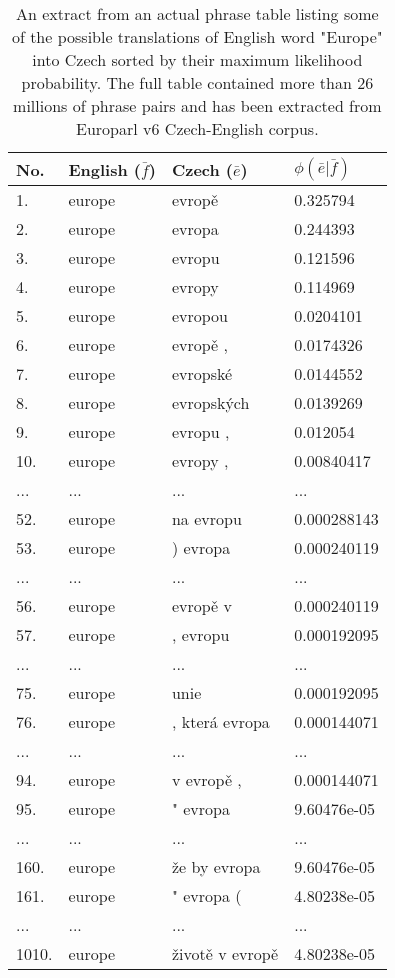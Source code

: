 \begin{table}[h]
\centering
\begin{tabular}{ l l l l }
No. & English ($\bar{f}$) & Czech ($\bar{e}$) & $\phi(\bar{e}|\bar{f})$ \\
\hline
\hline
1. & europe & evropě & 0.325794 \\
2. & europe & evropa & 0.244393 \\
3. & europe & evropu & 0.121596 \\
4. & europe & evropy & 0.114969 \\
5. & europe & evropou & 0.0204101 \\
6. & europe & evropě , & 0.0174326 \\
7. & europe & evropské & 0.0144552 \\
8. & europe & evropských & 0.0139269 \\
9. & europe & evropu , & 0.012054 \\
10. & europe & evropy , & 0.00840417 \\
... & ... & ... & ... \\
52. & europe & na evropu & 0.000288143 \\
53. & europe & ) evropa & 0.000240119 \\
... & ... & ... & ... \\
56. & europe & evropě v & 0.000240119 \\
57. & europe & , evropu & 0.000192095 \\
... & ... & ... & ... \\
75. & europe & unie & 0.000192095 \\
76. & europe & , která evropa & 0.000144071 \\
... & ... & ... & ... \\
94. & europe & v evropě , & 0.000144071 \\
95. & europe & " evropa & 9.60476e-05 \\
... & ... & ... & ... \\
160. & europe & že by evropa & 9.60476e-05 \\
161. & europe & " evropa ( & 4.80238e-05 \\
... & ... & ... & ... \\
1010. & europe & životě v evropě & 4.80238e-05 \\
\hline
\hline
\end{tabular}
\caption{\label{phrase-table-europarl}
An extract from an actual phrase table listing some of the possible translations of English
word "Europe" into Czech sorted by their maximum likelihood probability.
The full table contained more than 26 millions of phrase pairs and has been extracted
from Europarl v6 Czech-English corpus.}
\end{table}


